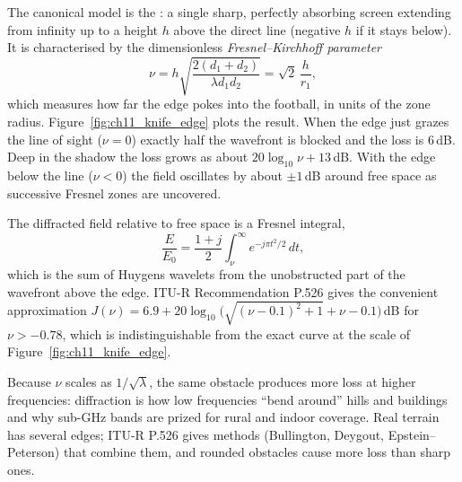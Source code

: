 
The canonical model is the : a single sharp, perfectly absorbing screen
extending from infinity up to a height $h$ above the direct line (negative $h$ if it stays below).
It is characterised by the dimensionless \emph{Fresnel--Kirchhoff parameter}
\begin{equation}
\nu=h\sqrt{\frac{2(d_1+d_2)}{\lambda d_1d_2}}=\sqrt2\,\frac{h}{r_1},
\end{equation}
which measures how far the edge pokes into the football, in units of the zone radius.
Figure~\ref{fig:ch11_knife_edge} plots the result. When the edge just grazes the line of sight
($\nu=0$) exactly half the wavefront is blocked and the loss is 6\,dB. Deep in the shadow the
loss grows as about $20\log_{10}\nu+13$\,dB. With the edge below the line ($\nu<0$) the field
oscillates by about $\pm1$\,dB around free space as successive Fresnel zones are uncovered.



\begin{deeper}
The diffracted field relative to free space is a Fresnel integral,
\begin{equation}
\frac{E}{E_0}=\frac{1+j}{2}\int_\nu^\infty e^{-j\pi t^2/2}\,dt ,
\end{equation}
which is the sum of Huygens wavelets from the unobstructed part of the wavefront above the edge.
ITU-R Recommendation P.526 gives the convenient approximation
$J(\nu)=6.9+20\log_{10}\bigl(\sqrt{(\nu-0.1)^2+1}+\nu-0.1\bigr)$\,dB for $\nu>-0.78$, which is
indistinguishable from the exact curve at the scale of Figure~\ref{fig:ch11_knife_edge}.
\end{deeper}



Because $\nu$ scales as $1/\sqrt\lambda$, the same obstacle produces more loss at higher
frequencies: diffraction is how low frequencies ``bend around'' hills and buildings and why
sub-GHz bands are prized for rural and indoor coverage. Real terrain has several edges; ITU-R
P.526 gives methods (Bullington, Deygout, Epstein--Peterson) that combine them, and rounded
obstacles cause more loss than sharp ones.

